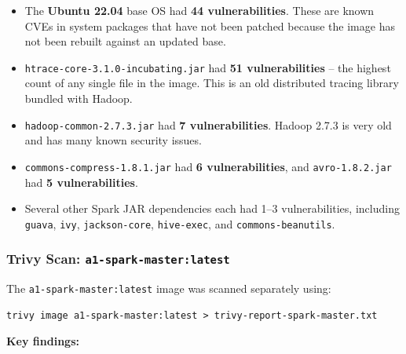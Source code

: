 \documentclass[11pt,a4paper]{article}
\begin{document}
\begin{itemize}[leftmargin=1.5cm]
  \item The \textbf{Ubuntu 22.04} base OS had \textbf{44 vulnerabilities}.
        These are known CVEs in system packages that have not been patched
        because the image has not been rebuilt against an updated base.
  \item \texttt{htrace-core-3.1.0-incubating.jar} had \textbf{51
        vulnerabilities} -- the highest count of any single file in the image.
        This is an old distributed tracing library bundled with Hadoop.
  \item \texttt{hadoop-common-2.7.3.jar} had \textbf{7 vulnerabilities}.
        Hadoop 2.7.3 is very old and has many known security issues.
  \item \texttt{commons-compress-1.8.1.jar} had \textbf{6 vulnerabilities},
        and \texttt{avro-1.8.2.jar} had \textbf{5 vulnerabilities}.
  \item Several other Spark JAR dependencies each had 1--3 vulnerabilities,
        including \texttt{guava}, \texttt{ivy}, \texttt{jackson-core},
        \texttt{hive-exec}, and \texttt{commons-beanutils}.
\end{itemize}

\subsubsection*{Trivy Scan: \texttt{a1-spark-master:latest}}

The \texttt{a1-spark-master:latest} image was scanned separately using:

\begin{lstlisting}[style=shell]
trivy image a1-spark-master:latest > trivy-report-spark-master.txt
\end{lstlisting}

\textbf{Key findings:}
\end{document}
